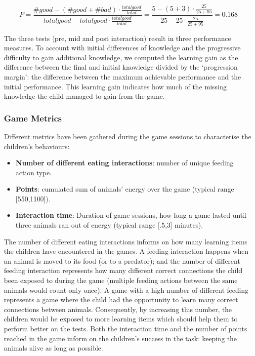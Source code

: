 \begin{equation}
P=\frac{\#good-(\#good+\#bad) \cdot \frac{total good}{total}}{total good - total good \cdot \frac{total good}{total}} = \frac{5-(5+3) \cdot \frac{25}{25+95}}{25 - 25 \cdot \frac{25}{25+95}}=0.168
\end{equation}
			
The three tests (pre, mid and post interaction) result in three performance measures. To account with initial differences of knowledge and the progressive difficulty to gain additional knowledge, we computed the learning gain as the difference between the final and initial knowledge divided by the `progression margin': the difference between the maximum achievable performance and the initial performance. This learning gain indicates how much of the missing knowledge the child managed to gain from the game.
			
\subsubsection{Game Metrics}
Different metrics have been gathered during the game sessions to characterise the children's behaviours:
\begin{itemize}
	\item \textbf{Number of different eating interactions}: number of unique feeding action type.
	\item \textbf{Points}: cumulated sum of animals' energy over the game (typical range [550,1100]).
	\item \textbf{Interaction time}: Duration of game sessions, how long a game lasted until three animals ran out of energy (typical range [.5,3] minutes).
\end{itemize}

The number of different eating interactions informs on how many learning items the children have encountered in the games. A feeding interaction happens when an animal is moved to its food (or to a predator); and the number of different feeding interaction represents how many different correct connections the child been exposed to during the game (multiple feeding actions between the same animals would count only once). A game with a high number of different feeding represents a game where the child had the opportunity to learn many correct connections between animals. Consequently, by increasing this number, the children would be exposed to more learning items which should help them to perform better on the tests. Both the interaction time and the number of points reached in the game inform on the children's success in the task: keeping the animals alive as long as possible. 


